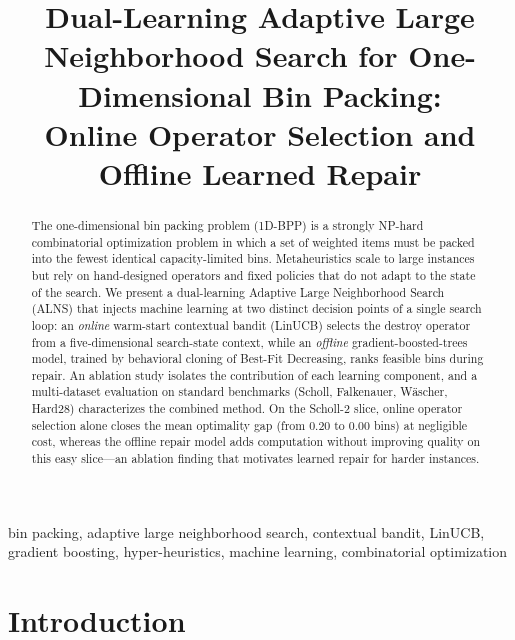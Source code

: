\documentclass[conference]{IEEEtran}
\begin{document}
\title{Dual-Learning Adaptive Large Neighborhood Search for One-Dimensional Bin Packing:\\
	Online Operator Selection and Offline Learned Repair}

\author{
}

\maketitle

\begin{abstract}
	The one-dimensional bin packing problem (1D-BPP) is a strongly NP-hard
	combinatorial optimization problem in which a set of weighted items must be
	packed into the fewest identical capacity-limited bins. Metaheuristics scale to
	large instances but rely on hand-designed operators and fixed policies that do
	not adapt to the state of the search. We present a dual-learning Adaptive Large
	Neighborhood Search (ALNS) that injects machine learning at two distinct decision
	points of a single search loop: an \emph{online} warm-start contextual bandit
	(LinUCB) selects the destroy operator from a five-dimensional search-state
	context, while an \emph{offline} gradient-boosted-trees model, trained by
	behavioral cloning of Best-Fit Decreasing, ranks feasible bins during repair. An
	ablation study isolates the contribution of each learning component, and a
	multi-dataset evaluation on standard benchmarks (Scholl, Falkenauer, W\"ascher,
	Hard28) characterizes the combined method. On the Scholl-2 slice, online operator
	selection alone closes the mean optimality gap (from $0.20$ to $0.00$ bins) at
	negligible cost, whereas the offline repair model adds computation without
	improving quality on this easy slice---an ablation finding that motivates learned
	repair for harder instances.
\end{abstract}

\begin{IEEEkeywords}
	bin packing, adaptive large neighborhood search, contextual bandit, LinUCB,
	gradient boosting, hyper-heuristics, machine learning, combinatorial optimization
\end{IEEEkeywords}

\section{Introduction}\label{sec:intro}
\end{document}
